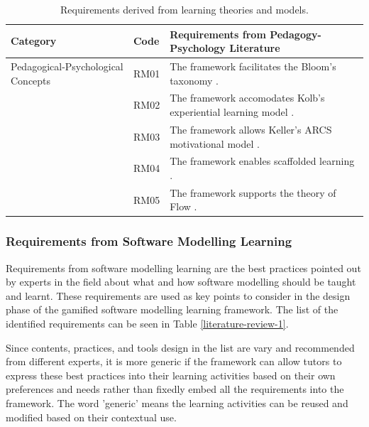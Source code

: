 \documentclass[12pt, a4paper]{report} \usepackage[titletoc]{appendix}
\begin{document}
\begin{table}[t!]
\caption{Requirements derived from learning theories and models.}
\label{design-learning-models}
\begin{center}
\begin{tabular}{ p{2.3cm}p{1cm}p{9.7cm} } 
\hline
Category & Code & Requirements from Pedagogy-Psychology Literature\\
\hline
\multirow{1}{2cm}{Pedagogical-Psychological Concepts} 
& RM01 & The framework facilitates the Bloom's taxonomy \cite{krathwohl2002revision}. \\
& RM02 & The framework accomodates Kolb's experiential learning model \cite{kolb2014experiential}. \\ 
& RM03 & The framework allows Keller's ARCS motivational model \cite{keller2010motivational}. \\
& RM04 & The framework enables scaffolded learning \cite{vygotsky1978mind, wood1976role}. \\
& RM05 & The framework supports the theory of Flow \cite{csikszentmihalyi2014toward}. \\ 
\hline
\end{tabular}
\end{center}
\end{table}

\subsubsection{Requirements from Software Modelling Learning}
\label{Requirements from Software Modelling Learning}
Requirements from software modelling learning are the best practices pointed out by experts in the field about what and how software modelling should be taught and learnt. These requirements are used as key points to consider in the design phase of the gamified software modelling learning framework. The list of the identified requirements can be seen in Table \ref{literature-review-1}. 

Since contents, practices, and tools design in the list are vary and recommended from different experts, it is more generic if the framework can allow tutors to express these best practices into their learning activities based on their own preferences and needs rather than fixedly embed all the requirements into the framework. The word 'generic' means the learning activities can be reused and modified based on their contextual use.
\end{document}

